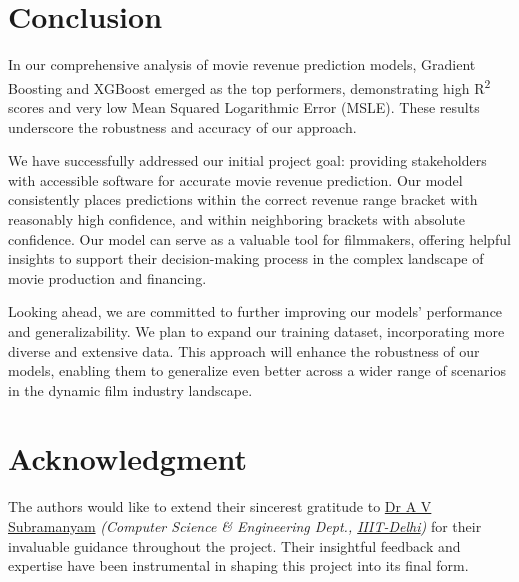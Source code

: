 \documentclass[conference]{IEEEtran}
\begin{document}
    \section{Conclusion}
    In our comprehensive analysis of movie revenue prediction models, Gradient Boosting and XGBoost emerged as the top performers, demonstrating high R\textsuperscript{2} scores and very low Mean Squared Logarithmic Error (MSLE). These results underscore the robustness and accuracy of our approach.


    We have successfully addressed our initial project goal: providing stakeholders with accessible software for accurate movie revenue prediction. Our model consistently places predictions within the correct revenue range bracket with reasonably high confidence, and within neighboring brackets with absolute confidence. Our model can serve as a valuable tool for filmmakers, offering helpful insights to support their decision-making process in the complex landscape of movie production and financing.


    Looking ahead, we are committed to further improving our models' performance and generalizability. We plan to expand our training dataset, incorporating more diverse and extensive data. This approach will enhance the robustness of our models, enabling them to generalize even better across a wider range of scenarios in the dynamic film industry landscape.

\section*{Acknowledgment}
    The authors would like to extend their sincerest gratitude to \href{https://www.iiitd.ac.in/subramanyam}{Dr A V Subramanyam} \textit{(Computer Science \& Engineering Dept., \href{https://www.iiitd.ac.in/}{IIIT-Delhi})} for their invaluable guidance throughout the project.
    Their insightful feedback and expertise have been instrumental in shaping this project into its final form.
\end{document}
